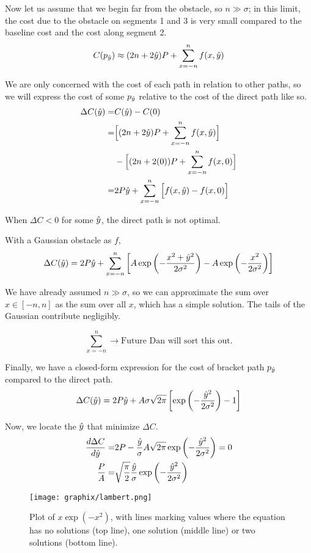 Now let us assume that we begin far from the obstacle, so $n \gg \sigma$; in this limit, the cost due to the obstacle on segments 1 and 3 is very small compared to the baseline cost and the cost along segment 2.
\begin{equation}
C(p_{\hat{y}}) \approx (2n+2\hat{y})P +  \sum\limits_{x=-n}^{n} f(x,\hat{y})
\end{equation}

We are only concerned with the cost of each path in relation to other paths, so we will express the cost of some $p_{\hat{y}}$ relative to the cost of the direct path like so. 
\begin{align*}
\Delta C(\hat{y}) =& C(\hat{y})-C(0) \\
=& \Big[(2n+2\hat{y})P +  \sum\limits_{x=-n}^{n} f(x,\hat{y}) \Big] \\
 & - \Big[(2n+2(0))P +  \sum\limits_{x=-n}^{n} f(x,0) \Big] \\
=& 2P\hat{y} + \sum\limits_{x=-n}^{n} \Big[ f(x,\hat{y})-f(x,0) \Big]
\end{align*}

When $\Delta C < 0$ for some $\hat{y}$, the direct path is not optimal.

With a Gaussian obstacle as $f$,
\begin{equation}
\Delta C(\hat{y}) = 2P\hat{y} + \sum\limits_{x=-n}^{n} \left[A\exp\left(-\frac{x^2 + \hat{y}^2}{2\sigma^2}\right) - A\exp\left(-\frac{x^2}{2\sigma^2}\right) \right]
\end{equation}

We have already assumed $n \gg \sigma$, so we can approximate the sum over $x \in [-n, n]$ as the sum over all $x$, which has a simple solution. The tails of the Gaussian contribute negligibly.

\begin{equation}
\sum\limits_{x=-n}^{n} \rightarrow \text{Future Dan will sort this out.}
\end{equation}

Finally, we have a closed-form expression for the cost of bracket path $p_{\hat{y}}$ compared to the direct path.
\begin{equation}
\Delta C(\hat{y}) = 2P\hat{y} + A\sigma\sqrt{2\pi}\left[\exp\left(-\frac{\hat{y}^2}{2\sigma^2}\right) - 1\right]
\end{equation}

Now, we locate the $\hat{y}$ that minimize $\Delta C$.
\begin{align}
\frac{d\Delta C}{d\yhat} = 
&2P - \frac{\yhat}{\sigma}A\sqrt{2\pi} \exp\left(-\frac{\yhat^2}{2\sigma^2} \right) = 0 \\
  \frac{P}{A} =& \sqrt{\frac{\pi}{2}} \frac{\yhat}{\sigma} \exp\left(-\frac{\yhat^2}{2\sigma^2} \right)
  \label{eq:PA}
\end{align}
\begin{figure}
\centering
\texttt{[image: graphix/lambert.png]}
\caption{Plot of $x \exp(-x^2)$, with lines marking values where the equation has no solutions (top line), one solution (middle line) or two solutions (bottom line).}
\label{fig:lambert}
\end{figure}

